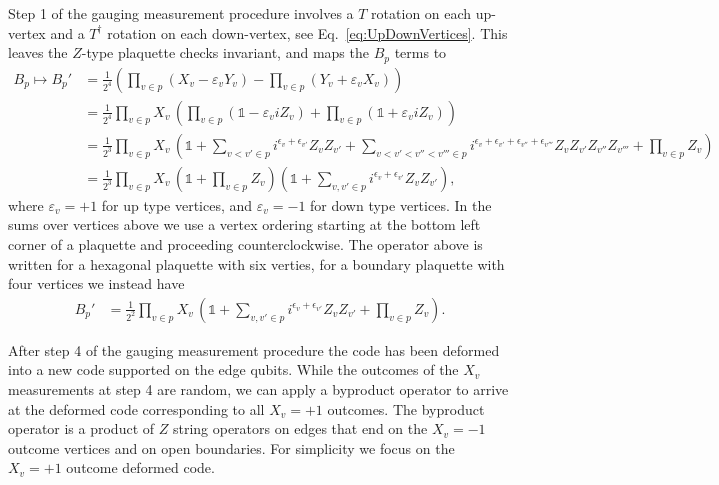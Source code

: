 Step 1 of the gauging measurement procedure involves a $T$ rotation on each up-vertex and a $T^\dagger$ rotation on each down-vertex, see Eq.~\eqref{eq:UpDownVertices}. 
This leaves the $Z$-type plaquette checks invariant, and maps the $B_p$ terms to
\begin{align}
    B_p \mapsto B_p' &= \frac{1}{2^{4}}(\prod_{v\in p} (X_v -\varepsilon_v Y_v) - \prod_{v\in p} (Y_v +\varepsilon_v X_v)) 
    \\
    &= \frac{1}{2^{4}} \prod_{v\in p} X_v \, (\prod_{v\in p} (\mathds{1} -\varepsilon_v i Z_v) +  \prod_{v\in p} ( \mathds{1} + \varepsilon_v i Z_v )) 
    \\
    &= \frac{1}{2^{3}} \prod_{v\in p} X_v \, (
    \mathds{1} + \sum_{v<v'\in p} i^{\epsilon_v+\epsilon_{v'}} Z_v Z_{v'} + \sum_{v<v'<v''<v'''\in p} i^{\epsilon_v+\epsilon_{v'}+\epsilon_{v''}+\epsilon_{v'''}} Z_v Z_{v'} Z_{v''} Z_{v'''} + \prod_{v \in p} Z_v
    ) 
    \label{eq:RotatedBp}
    \\
    & = \frac{1}{2^{3}} \prod_{v\in p} X_v \, (
    \mathds{1} + \prod_{v\in p} Z_v
    )(
    \mathds{1} + \sum_{v,v'\in p} i^{\epsilon_v+\epsilon_{v'}} Z_v Z_{v'} 
    ) ,
    \label{eq:RotatedBp2}
\end{align}
where $\varepsilon_v=+1$ for up type vertices, and $\varepsilon_v=-1$ for down type vertices. 
In the sums over vertices above we use a vertex ordering starting at the bottom left corner of a plaquette and proceeding counterclockwise. 
The operator above is written for a hexagonal plaquette with six verties, for a boundary plaquette with four vertices we instead have 
\begin{align}
    B_p' &= \frac{1}{2^{2}} \prod_{v\in p} X_v \, (
    \mathds{1} + \sum_{v,v'\in p} i^{\epsilon_v+\epsilon_{v'}} Z_v Z_{v'} + \prod_{v \in p} Z_v
    ) .
\end{align}

After step 4 of the gauging measurement procedure the code has been deformed into a new code supported on the edge qubits. 
While the outcomes of the $X_v$ measurements at step 4 are random, we can apply a byproduct operator to arrive at the deformed code corresponding to all $X_v=+1$ outcomes. 
The byproduct operator is a product of $Z$ string operators on edges that end on the $X_v=-1$ outcome vertices and on open boundaries. 
For simplicity we focus on the $X_v=+1$ outcome deformed code. 


